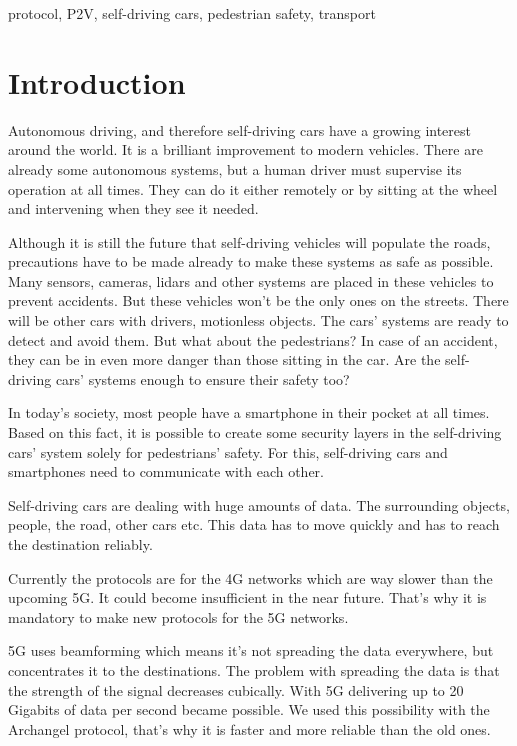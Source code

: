 \documentclass[conference]{IEEEtran}
\begin{document}
\begin{IEEEkeywords}
    protocol, P2V, self-driving cars, pedestrian safety, transport
\end{IEEEkeywords}

\section{Introduction}
Autonomous driving, and therefore self-driving cars have a growing interest around the world. It is a brilliant improvement to modern vehicles. There are already some autonomous systems, but a human driver must supervise its operation at all times. They can do it either remotely or by sitting at the wheel and intervening when they see it needed.

Although it is still the future that self-driving vehicles will populate the roads, precautions have to be made already to make these systems as safe as possible. Many sensors, cameras, lidars and other systems are placed in these vehicles to prevent accidents. But these vehicles won't be the only ones on the streets. There will be other cars with drivers, motionless objects. The cars' systems are ready to detect and avoid them. But what about the pedestrians? In case of an accident, they can be in even more danger than those sitting in the car. Are the self-driving cars' systems enough to ensure their safety too?

In today's society, most people have a smartphone in their pocket at all times. Based on this fact, it is possible to create some security layers in the self-driving cars' system solely for pedestrians' safety. For this, self-driving cars and smartphones need to communicate with each other. \cite{b1}

Self-driving cars are dealing with huge amounts of data. The surrounding objects, people, the road, other cars etc. This data has to move quickly and has to reach the destination reliably.

Currently the protocols are for the 4G networks which are way slower than the upcoming 5G. It could become insufficient in the near future. That's why it is mandatory to make new protocols for the 5G networks.

5G uses beamforming which means it's not spreading the data everywhere, but concentrates it to the destinations. The problem with spreading the data is that the strength of the signal decreases cubically. With 5G delivering up to 20 Gigabits of data per second became possible.
We used this possibility with the Archangel protocol, that's why it is faster and more reliable than the old ones.
\end{document}

